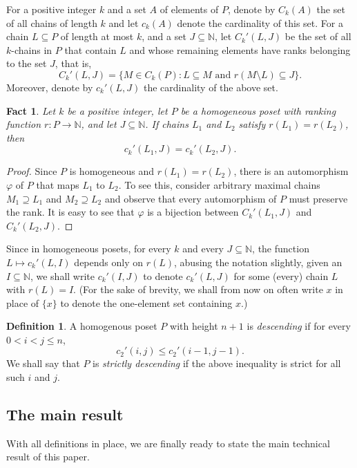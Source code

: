 \documentclass[11pt,a4paper,reqno]{amsart}
\newtheorem{fact}[thm]{Fact}
\numberwithin{claim}{thm}
\theoremstyle{definition}
\newtheorem{dfn}[thm]{Definition}
\newcommand{\Nat}{\mathbb{N}}
\renewcommand{\le}{\leqslant}
\begin{document}
For a positive integer $k$ and a set $A$ of elements of $P$, denote by $C_k(A)$ the set of all chains of length $k$ and let $c_k(A)$ denote the cardinality of this set. For a chain $L \subseteq P$ of length at most $k$, and a set $J \subseteq \Nat$, let $C_k'(L, J)$ be the set of all $k$-chains in $P$ that contain $L$ and whose remaining elements have ranks belonging to the set $J$, that is,
\[
  C_k'(L, J) = \{M \in C_k(P) \colon L \subseteq M \text{ and } r(M \setminus L) \subseteq J\}.
\]
Moreover, denote by $c_k'(L, J)$ the cardinality of the above set.

\begin{fact}
  \label{fact:ckLI-hom}
  Let $k$ be a positive integer, let $P$ be a homogeneous poset with ranking function $r \colon P \to \Nat$, and let $J \subseteq \Nat$. If chains $L_1$ and $L_2$ satisfy $r(L_1) = r(L_2)$, then
  \[
    c_k'(L_1, J) = c_k'(L_2, J).
  \]
\end{fact}
\begin{proof}
  Since $P$ is homogeneous and $r(L_1) = r(L_2)$, there is an automorphism $\varphi$ of $P$ that maps $L_1$ to $L_2$. To see this, consider arbitrary maximal chains $M_1 \supseteq L_1$ and $M_2 \supseteq L_2$ and observe that every automorphism of $P$ must preserve the rank. It is easy to see that $\varphi$ is a bijection between $C_k'(L_1, J)$ and $C_k'(L_2, J)$.
\end{proof}

Since in homogeneous posets, for every $k$ and every $J \subseteq \Nat$, the function $L \mapsto c_k'(L, I)$ depends only on $r(L)$, abusing the notation slightly, given an $I \subseteq \Nat$, we shall write $c_k'(I, J)$ to denote $c_k'(L, J)$ for some (every) chain $L$ with $r(L) = I$. (For the sake of brevity, we shall from now on often write $x$ in place of $\{x\}$ to denote the one-element set containing $x$.)

\begin{dfn}
  A homogenous poset $P$ with height $n+1$ is \emph{descending} if for every $0 < i < j \le n$,
  \[
    c_2'(i, j) \le c_2'(i-1, j-1).
  \]
  We shall say that $P$ is \emph{strictly descending} if the above inequality is strict for all such $i$ and $j$.
\end{dfn}

\subsection{The main result}
\label{sec:main-result}

With all definitions in place, we are finally ready to state the main technical result of this paper.
\end{document}
